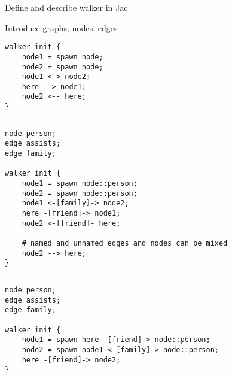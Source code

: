Define and describe walker in Jac

Introduce graphs, nodes, edges


\begin{description}
    \begin{lstlisting}[caption={Simple walker creating and connected nodes}]
walker init {
    node1 = spawn node;
    node2 = spawn node;
    node1 <-> node2;
    here --> node1;
    node2 <-- here;
}
    \end{lstlisting}
    \item[Output] \texttt{}
          \begin{lstlisting}[language=shell]
        \end{lstlisting}
    \item[Description] \texttt{}
\end{description}


\begin{description}
    \begin{lstlisting}[caption={Creating named node types}]
node person;
edge assists;
edge family;

walker init {
    node1 = spawn node::person;
    node2 = spawn node::person;
    node1 <-[family]-> node2;
    here -[friend]-> node1;
    node2 <-[friend]- here;

    # named and unnamed edges and nodes can be mixed
    node2 --> here;
}
    \end{lstlisting}
    \item[Output] \texttt{}
          \begin{lstlisting}[language=shell]
        \end{lstlisting}
    \item[Description] \texttt{}
\end{description}


\begin{description}
    \begin{lstlisting}[caption={Connecting nodes within \texttt{spawn} statement}]
node person;
edge assists;
edge family;

walker init {
    node1 = spawn here -[friend]-> node::person;
    node2 = spawn node1 <-[family]-> node::person;
    here -[friend]-> node2;
}
    \end{lstlisting}
    \item[Output] \texttt{}
          \begin{lstlisting}[language=shell]
        \end{lstlisting}
    \item[Description] \texttt{}
\end{description}


